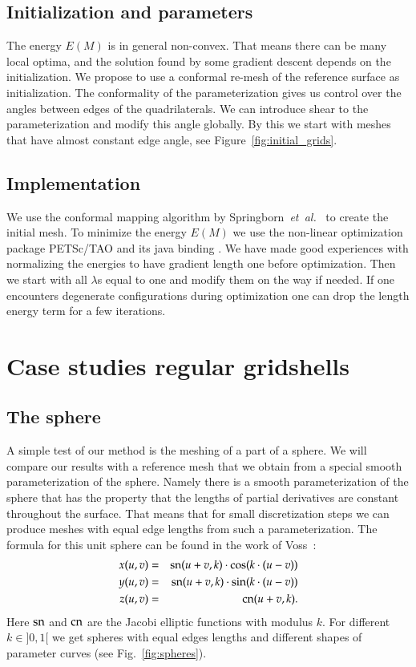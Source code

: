 \documentclass[Thesis.tex]{subfiles}
\begin{document}
\subsection{Initialization and parameters}
The energy $E(M)$ is in general non-convex. That means there can be many local optima, and the solution found by some gradient descent depends on the initialization. We propose to use a conformal re-mesh of the reference surface as initialization. The conformality of the parameterization gives us control over the angles between edges of the quadrilaterals. We can introduce shear to the parameterization and modify this angle globally. By this we start with meshes that have almost constant edge angle, see Figure~\ref{fig:initial_grids}.

\subsection{Implementation}
We use the conformal mapping algorithm by Springborn~\emph{et~al.}~\cite{Springborn2008} to create the
initial mesh. To minimize the energy $E(M)$ we use the non-linear optimization package
PETSc/TAO \cite{petsc-web-page,tao-user-ref} and its java binding 
\cite{jpetsctao-web-page}. We have made good experiences with normalizing the
 energies to have gradient length one before optimization. Then we start with all
$\lambda$s equal to one and modify them on the way if needed. If one encounters
degenerate configurations during optimization one can drop the length energy term for 
a few iterations.

\section{Case studies regular gridshells}

\subsection{The sphere}
A simple test of our method is the meshing of a part of a sphere. We will compare our results with a reference mesh that we obtain from a special smooth parameterization of the sphere. Namely there is a smooth parameterization of the sphere that has the property that the lengths of partial derivatives are constant throughout the surface. That means that for small discretization steps we can produce meshes with equal edge lengths from such a parameterization. The formula for this unit sphere can be found in the work of Voss~\cite{Voss1881}:
\begin{eqnarray*}
	x(u,v)&=&\operatorname{sn}(u+v, k)\cdot \cos(k\cdot (u-v))\\
	y(u,v)&=&\operatorname{sn}(u+v, k)\cdot \sin(k\cdot (u-v))\\
	z(u,v)&=&\operatorname{cn}(u+v, k).
\end{eqnarray*}
Here $\operatorname{sn}$ and $\operatorname{cn}$ are the Jacobi elliptic functions with modulus $k$. For different $k\in ]0,1[$ we get spheres with equal edges lengths and different shapes of parameter curves (see Fig.~\ref{fig:spheres}).
\end{document}
